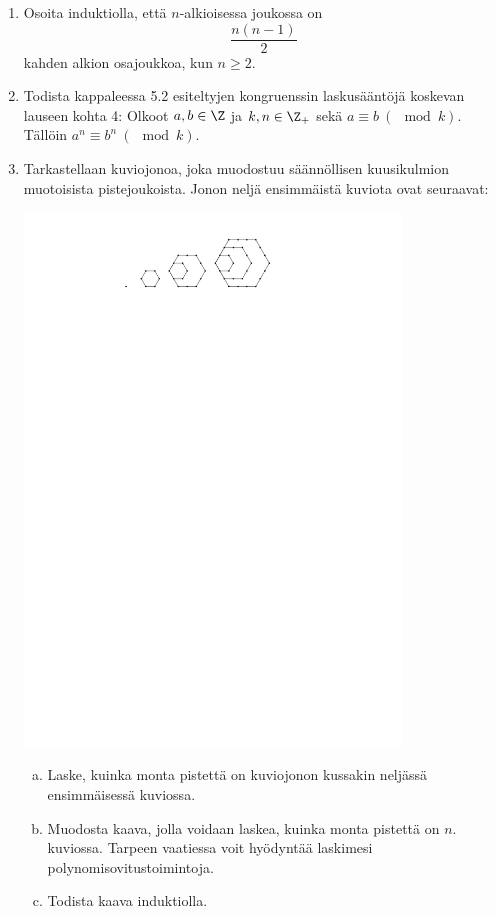 \begin{enumerate}
\item
Osoita induktiolla, että $n$-alkioisessa joukossa on
\[
\frac{n(n-1)}{2}
\]
kahden alkion osajoukkoa, kun $n \ge 2$.

\item Todista kappaleessa 5.2 esiteltyjen kongruenssin laskusääntöjä koskevan lauseen kohta 4: Olkoot $a, b \in \Z$ ja $k, n \in \Z_+$ sekä $a \equiv b\ (\mod k)$. Tällöin $a^n \equiv b^n\ (\mod k)$.

\item Tarkastellaan kuviojonoa, joka muodostuu säännöllisen kuusikulmion muotoisista pistejoukoista. Jonon neljä ensimmäistä kuviota ovat seuraavat:

\begin{center}
\includegraphics[width=10cm]{pictures/Kappale5_4_kuusikulm_v2}
\end{center}


\begin{enumerate}[a)]
\item Laske, kuinka monta pistettä on kuviojonon kussakin neljässä ensimmäisessä kuviossa.
\item Muodosta kaava, jolla voidaan laskea, kuinka monta pistettä on $n$. kuviossa. Tarpeen vaatiessa voit hyödyntää laskimesi polynomisovitustoimintoja.
\item Todista kaava induktiolla.
\end{enumerate}

\end{enumerate}

